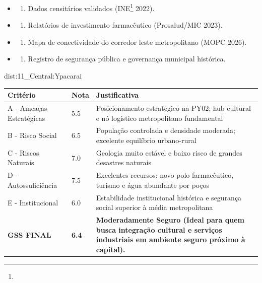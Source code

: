 {\begin{itemize}
\tightlist
\item
  \begin{enumerate}
  \def\labelenumi{\arabic{enumi})}
  \tightlist
  \item
    Dados censitários validados (INE\footnote{\fineINE} 2022).
  \end{enumerate}
\item
  \begin{enumerate}
  \def\labelenumi{\arabic{enumi})}
  \setcounter{enumi}{1}
  \tightlist
  \item
    Relatórios de investimento farmacêutico (Prosalud/\allowbreak MIC 2023).
  \end{enumerate}
\item
  \begin{enumerate}
  \def\labelenumi{\arabic{enumi})}
  \setcounter{enumi}{2}
  \tightlist
  \item
    Mapa de conectividade do corredor leste metropolitano (MOPC 2026).
  \end{enumerate}
\item
  \begin{enumerate}
  \def\labelenumi{\arabic{enumi})}
  \setcounter{enumi}{3}
  \tightlist
  \item
    Registro de segurança pública e governança municipal histórica.
  \end{enumerate}
\end{itemize}}{dist:11_Central:Ypacarai}
\begin{table}[ht!]
\small \begin{tabular}{p{3.0cm}p{0.8cm}p{6.0cm}} \toprule
\textbf{Critério} & \textbf{Nota} & \textbf{Justificativa} \\ \midrule
A - Ameaças Estratégicas & 5.5 & Posicionamento estratégico na PY02; hub cultural e nó logístico metropolitano fundamental \\
B - Risco Social & 6.5 & População controlada e densidade moderada; excelente equilíbrio urbano-rural \\
C - Riscos Naturais & 7.0 & Geologia muito estável e baixo risco de grandes desastres naturais \\
D - Autossuficiência & 7.5 & Excelentes recursos: novo polo farmacêutico, turismo e água abundante por poços \\
E - Institucional & 6.0 & Estabilidade institucional histórica e segurança social superior à média metropolitana \\
\midrule \textbf{GSS FINAL} & \textbf{6.4} & \textbf{Moderadamente Seguro (Ideal para quem busca integração cultural e serviços industriais em ambiente seguro próximo à capital).} \\ \bottomrule \end{tabular}
\end{table}
